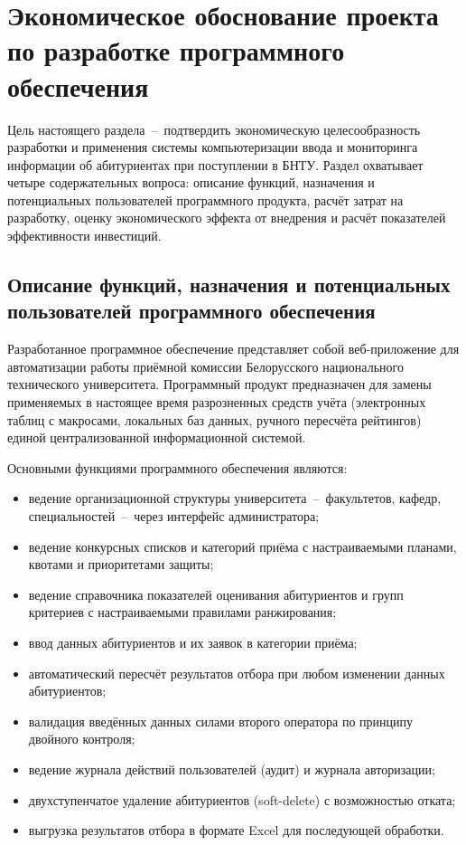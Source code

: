 \providecommand{\rv}[1]{\text{#1}}

\section{Экономическое обоснование проекта по разработке программного обеспечения}

Цель настоящего раздела~--~подтвердить экономическую целесообразность разработки и применения системы компьютеризации ввода и мониторинга информации об абитуриентах при поступлении в БНТУ.
Раздел охватывает четыре содержательных вопроса: описание функций, назначения и потенциальных пользователей программного продукта, расчёт затрат на разработку, оценку экономического эффекта от внедрения и расчёт показателей эффективности инвестиций.

\subsection{Описание функций, назначения и потенциальных пользователей программного обеспечения}

Разработанное программное обеспечение представляет собой веб-приложение для автоматизации работы приёмной комиссии Белорусского национального технического университета.
Программный продукт предназначен для замены применяемых в настоящее время разрозненных средств учёта (электронных таблиц с макросами, локальных баз данных, ручного пересчёта рейтингов) единой централизованной информационной системой.

Основными функциями программного обеспечения являются:
\begin{itemize}
\item ведение организационной структуры университета~--~факультетов, кафедр, специальностей~--~через интерфейс администратора;
\item ведение конкурсных списков и категорий приёма с настраиваемыми планами, квотами и приоритетами защиты;
\item ведение справочника показателей оценивания абитуриентов и групп критериев с настраиваемыми правилами ранжирования;
\item ввод данных абитуриентов и их заявок в категории приёма;
\item автоматический пересчёт результатов отбора при любом изменении данных абитуриентов;
\item валидация введённых данных силами второго оператора по принципу двойного контроля;
\item ведение журнала действий пользователей (аудит) и журнала авторизации;
\item двухступенчатое удаление абитуриентов (soft-delete) с возможностью отката;
\item выгрузка результатов отбора в формате Excel для последующей обработки.
\end{itemize}

